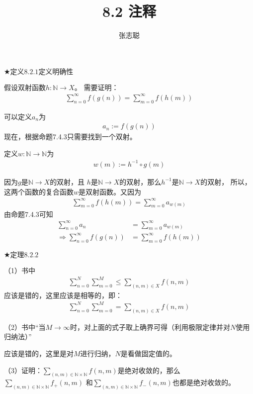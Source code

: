 \documentclass{article}
\begin{document}
\title{8.2 注释}
\author{张志聪}
\maketitle

$\bigstar \textbf{定义}8.2.1 \textbf{定义明确性}$

假设双射函数$h: \mathbb{N} \rightarrow X$。
需要证明：
\begin{align*}
    \sum \limits_{n=0}^\infty f(g(n)) = \sum \limits_{m=0}^\infty f(h(m))
\end{align*}

可以定义$a_n$为
\begin{align*}
    a_n := f(g(n))
\end{align*}
现在，根据命题7.4.3只需要找到一个双射。

定义$w: \mathbb{N} \rightarrow \mathbb{N}$为
\begin{align*}
    w(m) := h^{-1} \circ g(m)
\end{align*}

因为$g$是$\mathbb{N} \rightarrow X$的双射，且
$h$是$\mathbb{N} \rightarrow X$的双射，那么$h^{-1}$是$\mathbb{N} \rightarrow X$的双射，
所以，这两个函数的复合函数$w$是双射函数。又因为
\begin{align*}
    \sum \limits_{m=0}^\infty f(h(m)) = \sum \limits_{m=0}^\infty a_{w(m)}
\end{align*}
由命题7.4.3可知
\begin{align*}
    \sum \limits_{n=0}^\infty a_n                 & = \sum \limits_{m=0}^\infty a_{w(m)} \\
    \Rightarrow \sum \limits_{n=0}^\infty f(g(n)) & = \sum \limits_{m=0}^\infty f(h(m))
\end{align*}


$\bigstar \textbf{定理}8.2.2$

（1）书中
\begin{align*}
    \sum \limits_{n=0}^N \sum \limits_{m=0}^M \leq \sum \limits_{(n,m) \in X}f(n,m)
\end{align*}
应该是错的，这里应该是相等的，即：
\begin{align*}
    \sum \limits_{n=0}^N \sum \limits_{m=0}^M = \sum \limits_{(n,m) \in X}f(n,m)
\end{align*}

（2）书中“当$M \rightarrow \infty$时，对上面的式子取上确界可得（利用极限定律并对$N$使用归纳法）”

应该是错的，这里是对$M$进行归纳，$N$是看做固定值的。

（3）证明：$\sum \limits_{(n,m) \in \mathbb{N} \times \mathbb{N}}f(n,m)$是绝对收敛的，那么
$\sum \limits_{(n,m) \in \mathbb{N} \times \mathbb{N}}f_{+}(n,m)$
和$\sum \limits_{(n,m) \in \mathbb{N} \times \mathbb{N}}f_{-}(n,m)$也都是绝对收敛的。
\end{document}
